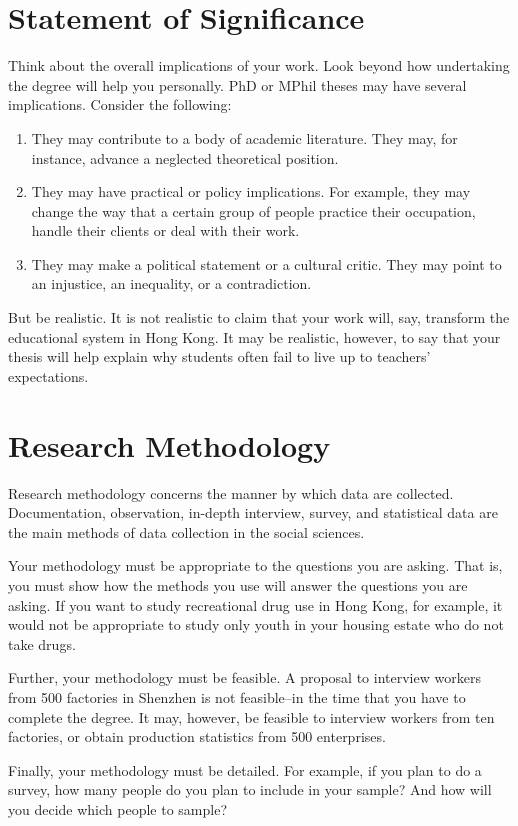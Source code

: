 \documentclass[journal,onecolumn,12pt]{IEEEtran}
\begin{document}
\section{Statement of Significance}
Think about the overall implications of your work. Look beyond how undertaking the degree will help you
personally. PhD or MPhil theses may have several implications. Consider the following:
\begin{enumerate}
  \item They may contribute to a body of academic literature. They may, for instance, advance a neglected theoretical
position.
  \item They may have practical or policy implications. For example, they may change the way that a certain group
of people practice their occupation, handle their clients or deal with their work.
  \item They may make a political statement or a cultural critic. They may point to an injustice, an inequality, or a
contradiction.
\end{enumerate}

But be realistic. It is not realistic to claim that your work will, say, transform the educational system in Hong
Kong. It may be realistic, however, to say that your thesis will help explain why students often fail to live up to
teachers' expectations.

\section{Research Methodology}
Research methodology concerns the manner by which data are collected. Documentation, observation, in-depth
interview, survey, and statistical data are the main methods of data collection in the social sciences.

Your methodology must be  appropriate  to the questions you are asking. That is, you must show how the
methods you use will answer the questions you are asking. If you want to study recreational drug use in Hong
Kong, for example, it would not be appropriate to study only youth in your housing estate who do not take drugs.

Further, your methodology must be feasible. A proposal to interview workers from 500 factories in Shenzhen is
not feasible--in the time that you have to complete the degree. It may, however, be feasible to interview workers
from ten factories, or obtain production statistics from 500 enterprises.

Finally, your methodology must be detailed. For example, if you plan to do a survey, how many people do you
plan to include in your sample? And how will you decide which people to sample?

\nocite{*}

\renewcommand\refname{References}


\end{document}
